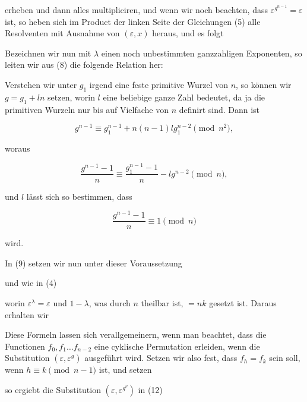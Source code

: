 erheben und dann alles multipliciren, und wenn wir noch beachten, dass
$\varepsilon^{g^{n-1}} = \varepsilon$ ist, so heben sich im Product der
linken Seite der Gleichungen (5) alle Resolventen mit Ausnahme von
$(\varepsilon, x)$ heraus, und es folgt


Bezeichnen wir nun mit $\lambda$ einen noch unbestimmten ganzzahligen
Exponenten, so leiten wir aus (8) die folgende Relation her:


Verstehen wir unter $g_1$ irgend eine feste primitive Wurzel von $n$, so
können wir $g = g_1 + l n$ setzen, worin $l$ eine beliebige ganze Zahl
bedeutet, da ja die primitiven Wurzeln nur bis auf Vielfache von $n$
definirt sind. Dann ist

\[
g^{n-1} \equiv g_1^{n-1} + n(n-1) l g_1^{n-2} \pmod{n^2},
\]

woraus

\[
\frac{g^{n-1}-1}{n} \equiv \frac{g_1^{n-1}-1}{n} - l g^{n-2} \pmod{n},
\]

und $l$ lässt sich so bestimmen, dass

\[
\frac{g^{n-1}-1}{n} \equiv 1 \pmod{n}
\]

wird.

In (9) setzen wir nun unter dieser Voraussetzung


und wie in (4)


worin $\varepsilon^\lambda = \varepsilon$ und $1 - \lambda$, was durch $n$
theilbar ist, $= nk$ gesetzt ist. Daraus erhalten wir


Diese Formeln lassen sich verallgemeinern, wenn man beachtet, dass die
Functionen $f_0, f_1 \ldots f_{n-2}$ eine cyklische Permutation erleiden,
wenn die Substitution $(\varepsilon, \varepsilon^g)$ ausgeführt wird.
Setzen wir also fest, dass $f_h = f_k$ sein soll, wenn $h \equiv k
\pmod{n-1}$ ist, und setzen


so ergiebt die Substitution $(\varepsilon, \varepsilon^{g^\nu})$ in (12)

